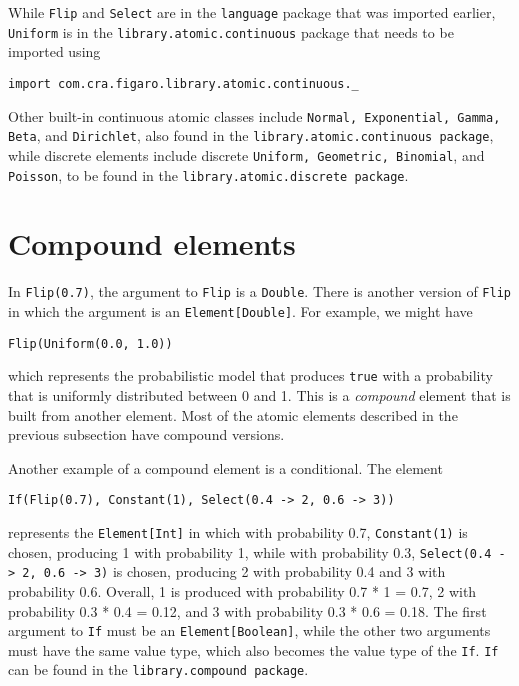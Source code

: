 While \texttt{Flip} and \texttt{Select} are in the \texttt{language} package that was imported earlier, \texttt{Uniform} is in the \texttt{library.atomic.continuous} package that needs to be imported using
 
\begin{flushleft}
\texttt{import com.cra.figaro.library.atomic.continuous.\_}
\end{flushleft}

Other built-in continuous atomic classes include \texttt{Normal, Exponent\-ial, Gamma, Beta}, and \texttt{Dirichlet}, also found in the \texttt{library.atomic.\-continuous package}, while discrete elements include discrete \texttt{Uniform, Geometric, Binomial}, and \texttt{Poisson}, to be found in the \texttt{library.atomic.\-discrete package}.

\section{Compound elements}

In \texttt{Flip(0.7)}, the argument to \texttt{Flip} is a \texttt{Double}. There is another version of \texttt{Flip} in which the argument is an \texttt{Element[Double]}. For example, we might have

\begin{flushleft}
\texttt{Flip(Uniform(0.0, 1.0)) }
\end{flushleft}

which represents the probabilistic model that produces \texttt{true} with a probability that is uniformly distributed between 0 and 1. This is a \emph{compound} element that is built from another element. Most of the atomic elements described in the previous subsection have compound versions.

Another example of a compound element is a conditional. The element

\begin{flushleft}
\texttt{If(Flip(0.7), Constant(1), Select(0.4 -> 2, 0.6 -> 3))}
\end{flushleft}

represents the \texttt{Element[Int]} in which with probability 0.7, \texttt{Constant\-(1)} is chosen, producing 1 with probability 1, while with probability 0.3, \texttt{Select(0.4
-> 2, 0.6 -> 3)} is chosen, producing 2 with probability 0.4 and 3 with probability 0.6. Overall, 1 is produced with probability 0.7 * 1 = 0.7, 2 with probability 0.3 * 0.4 = 0.12, and 3 with probability 0.3 * 0.6 = 0.18. The first argument to \texttt{If} must be an \texttt{Element[Boolean]}, while the other two arguments must have the same value type, which also becomes the value type of the \texttt{If}. \texttt{If} can be found in the \texttt{library.compound package}. 

